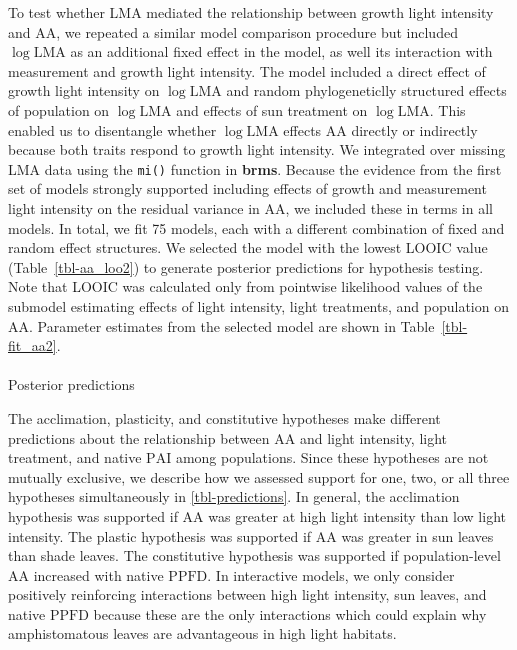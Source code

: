 \documentclass[
  letterpaper,
  DIV=11,
  numbers=noendperiod]{scrartcl}
\makeatletter
\let\oldparagraph\paragraph
\renewcommand{\paragraph}{
    \@ifstar
      \xxxParagraphStar
      \xxxParagraphNoStar
  }
\newcommand{\xxxParagraphStar}[1]{\oldparagraph*{#1}\mbox{}}
\newcommand{\xxxParagraphNoStar}[1]{\oldparagraph{#1}\mbox{}}
\newcommand{\aax}{$\mathrm{AA}$}
\newcommand{\ppfd}{$\mathrm{PPFD}$}
\makeatother
\begin{document}
To test whether LMA mediated the relationship between growth light
intensity and \aax{}, we repeated a similar model comparison procedure
but included \(\log \mathrm{LMA}\) as an additional fixed effect in the
model, as well its interaction with measurement and growth light
intensity. The model included a direct effect of growth light intensity
on \(\log \mathrm{LMA}\) and random phylogeneticlly structured effects
of population on \(\log \mathrm{LMA}\) and effects of sun treatment on
\(\log \mathrm{LMA}\). This enabled us to disentangle whether
\(\log \mathrm{LMA}\) effects \aax{} directly or indirectly because both
traits respond to growth light intensity. We integrated over missing LMA
data using the \texttt{mi()} function in \textbf{brms}. Because the
evidence from the first set of models strongly supported including
effects of growth and measurement light intensity on the residual
variance in \(\mathrm{AA}\), we included these in terms in all models.
In total, we fit 75 models, each with a different combination of fixed
and random effect structures. We selected the model with the lowest
LOOIC value (Table~\ref{tbl-aa_loo2}) to generate posterior predictions
for hypothesis testing. Note that LOOIC was calculated only from
pointwise likelihood values of the submodel estimating effects of light
intensity, light treatments, and population on \aax{}. Parameter
estimates from the selected model are shown in Table~\ref{tbl-fit_aa2}.

\paragraph{Posterior predictions}\label{sec-predictions}

The acclimation, plasticity, and constitutive hypotheses make different
predictions about the relationship between \aax{} and light intensity,
light treatment, and native \(\mathrm{PAI}\) among populations. Since
these hypotheses are not mutually exclusive, we describe how we assessed
support for one, two, or all three hypotheses simultaneously in
\autoref{tbl-predictions}. In general, the acclimation hypothesis was
supported if \aax{} was greater at high light intensity than low light
intensity. The plastic hypothesis was supported if \aax{} was greater in
sun leaves than shade leaves. The constitutive hypothesis was supported
if population-level \aax{} increased with native \ppfd. In interactive
models, we only consider positively reinforcing interactions between
high light intensity, sun leaves, and native \ppfd{} because these are
the only interactions which could explain why amphistomatous leaves are
advantageous in high light habitats.
\end{document}

